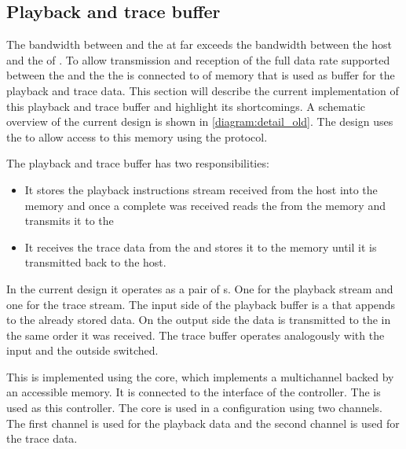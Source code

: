 \subsection{Playback and trace buffer}\label{sec:old-pb-trace-management}
The bandwidth between \FPGA{} and the \ASIC{} at \ASICBandwidth{} far exceeds the bandwidth between the host and the \FPGA{} of \HostBandwidth{}. To allow transmission and reception of the full data rate supported between the \FPGA{} and the \ASIC{} the \FPGA{} is connected to \DDRSIZE{} of \DDR{} memory that is used as buffer for the playback and trace data. This section will describe the current implementation of this playback and trace buffer and highlight its shortcomings. A schematic overview of the current design is shown in \autoref{diagram:detail_old}. The \FPGA{} design uses the \XilinxMIG{} to allow access to this \DDR{} memory using the \AXI{} protocol.

The playback and trace buffer has two responsibilities:
\begin{itemize}
  \item It stores the playback instructions stream received from the host into the \DDR{} memory and once a complete \PlaybackProgram{} was received reads the \PlaybackProgram{} from the memory and transmits it to the \pbexec{}
  \item It receives the trace data from the \pbexec{} and stores it to the \DDR{} memory until it is transmitted back to the host.
\end{itemize}

In the current \FPGA{} design it operates as a pair of \FIFO{}s. One for the playback stream and one for the trace stream. The input side of the playback buffer is a \ValidNextStream{} that appends to the already stored data. On the output side the data is transmitted to the \pbexec{} in the same order it was received. The trace buffer operates analogously with the input and the outside switched.

This \FIFO{} is implemented using the \Xilinx{} \VFIFO{} core, which implements a multichannel \FIFO{} backed by an \AXI{} accessible memory. It is connected to the \AXI{} interface of the \DDR{} controller. The \XilinxMIG{} is used as this \DDR{} controller. The \VFIFO{} core is used in a configuration using two channels. The first channel is used for the playback data and the second channel is used for the trace data.

